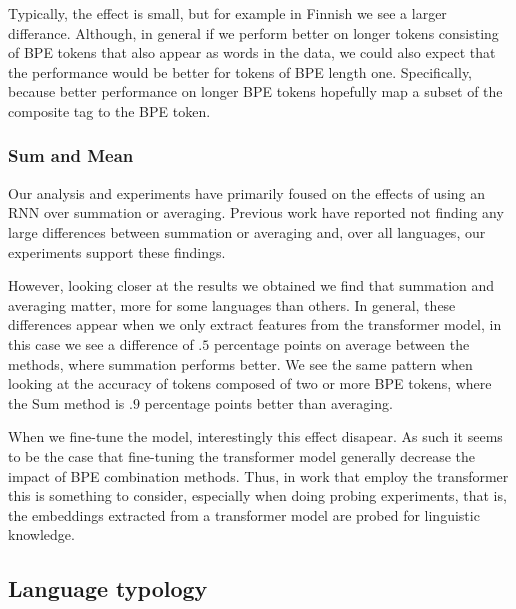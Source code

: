 \documentclass[11pt]{article}
\begin{document}
        Typically, the effect is small, but for example in Finnish we
     see a larger differance. Although, in general if we perform
     better on longer tokens consisting of BPE tokens that also appear
     as words in the data, we could also expect that the performance
     would be better for tokens of BPE length one. Specifically,
     because better performance on longer BPE tokens hopefully map a
     subset of the composite tag to the BPE token.

    \subsubsection{Sum and Mean}

        Our analysis and experiments have primarily foused on the
     effects of using an RNN over summation or averaging. Previous
     work have reported not finding any large differences between
     summation or averaging and, over all languages, our experiments
     support these findings.

            However, looking closer at the results we obtained
     we find that summation and averaging matter, more for some
     languages than others. In general, these differences appear when
     we only extract features from the transformer model, in this case
     we see a difference of $.5$ percentage points on average between
     the methods, where summation performs better. We see the
     same pattern when looking at the accuracy of tokens composed of
     two or more BPE tokens, where the Sum method is $.9$ percentage
     points better than averaging.

             When we fine-tune the model, interestingly this effect
     disapear. As such it seems to be the case that fine-tuning the
     transformer model generally decrease the impact of BPE
     combination methods. Thus, in work that employ the transformer
     this is something to consider, especially when doing probing
     experiments, that is, the embeddings extracted from a transformer
     model are probed for linguistic knowledge.
    

    \subsection{Language typology}
\end{document}
